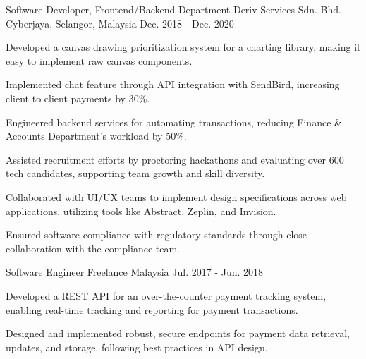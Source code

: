 \begin{cventries}
  \cventry
    {Software Developer, Frontend/Backend Department} %
    {Deriv Services Sdn. Bhd.} %
    {Cyberjaya, Selangor, Malaysia} %
    {Dec. 2018 - Dec. 2020} %
    {
      \begin{cvitems} %
        \item {Developed a canvas drawing prioritization system for a charting library, making it easy to implement raw canvas components.}
        \item {Implemented chat feature through API integration with SendBird, increasing client to client payments by 30\%.}
        \item {Engineered backend services for automating transactions, reducing Finance \& Accounts Department's workload by 50\%.}
        \item {Assisted recruitment efforts by proctoring hackathons and evaluating over 600 tech candidates, supporting team growth and skill diversity.}
        \item {Collaborated with UI/UX teams to implement design specifications across web applications, utilizing tools like Abstract, Zeplin, and Invision.}
        \item {Ensured software compliance with regulatory standards through close collaboration with the compliance team.}
      \end{cvitems}
    }

  \cventry
    {Software Engineer} %
    {Freelance} %
    {Malaysia} %
    {Jul. 2017 - Jun. 2018} %
    {
      \begin{cvitems} %
        \item {Developed a REST API for an over-the-counter payment tracking system, enabling real-time tracking and reporting for payment transactions.}
        \item {Designed and implemented robust, secure endpoints for payment data retrieval, updates, and storage, following best practices in API design.}
      \end{cvitems}
    }
\end{cventries}
